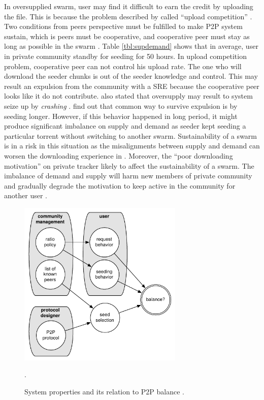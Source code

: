 In oversupplied swarm, user may find it difficult to earn the credit by uploading the file. This is because the problem described by \citeauthor{2011:managesupplydemand:meulpolder} called ``upload competition'' \cite{2011:managesupplydemand:meulpolder}. Two conditions from peers perspective must be fulfilled to make P2P system sustain, which is peers must be cooperative, and cooperative peer must stay as long as possible in the swarm \cite{2011:managesupplydemand:meulpolder}. Table \ref{tbl:supdemand} shows that in average, user in private community standby for seeding for 50 hours. In upload competition problem, cooperative peer can not control his upload rate. The one who will download the seeder chunks is out of the seeder knowledge and control. This may result an expulsion from the community with a SRE because the cooperative peer looks like it do not contribute. \citeauthor{2010:crashsustain:rahman} also stated that oversupply may result to system seize up by \textit{crashing}  \cite{2010:crashsustain:rahman}. \citeauthor{2013:survivepriv:jia} find out that common way to survive expulsion is by seeding longer. However, if this behavior happened in long period, it might produce significant imbalance on supply and demand as seeder kept seeding a particular torrent without switching to another swarm. Sustainability of a swarm is in a risk in this situation as the misalignments between supply and demand can worsen the downloading experience in \bt. Moreover, the ``poor downloading motivation'' on private tracker likely to affect the sustainability of a swarm. The imbalance of demand and supply will harm new members of private community and gradually degrade the motivation to keep active in the community for another user \cite{2014:sustainabilitytorrent:chen}.

\begin{figure}[h]
	\centering
	\includegraphics[width=0.7\textwidth]{pics/p2psys_balance.pdf}
	\caption{System properties and its relation to P2P balance \cite{2011:managesupplydemand:meulpolder}.}.
	\label{fig:sysbalance}
\end{figure}

